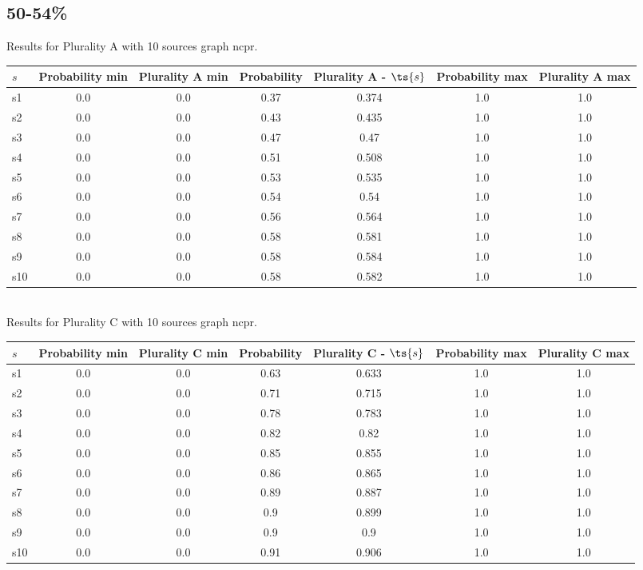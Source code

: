 \documentclass{article}
\begin{document}
\newpage

\subsection{50-54\%}

\noindent Results for Plurality A with 10 sources graph ncpr.

\noindent\begin{tabular}{|l|c|c|c|c|c|c|}
\hline
$s$& Probability min & Plurality A min & Probability & Plurality A - $\ts{s}$ & Probability max & Plurality A max\\
\hline
s1 &0.0 & 0.0 & 0.37 & 0.374 & 1.0 & 1.0\\
\hline
s2 &0.0 & 0.0 & 0.43 & 0.435 & 1.0 & 1.0\\
\hline
s3 &0.0 & 0.0 & 0.47 & 0.47 & 1.0 & 1.0\\
\hline
s4 &0.0 & 0.0 & 0.51 & 0.508 & 1.0 & 1.0\\
\hline
s5 &0.0 & 0.0 & 0.53 & 0.535 & 1.0 & 1.0\\
\hline
s6 &0.0 & 0.0 & 0.54 & 0.54 & 1.0 & 1.0\\
\hline
s7 &0.0 & 0.0 & 0.56 & 0.564 & 1.0 & 1.0\\
\hline
s8 &0.0 & 0.0 & 0.58 & 0.581 & 1.0 & 1.0\\
\hline
s9 &0.0 & 0.0 & 0.58 & 0.584 & 1.0 & 1.0\\
\hline
s10 &0.0 & 0.0 & 0.58 & 0.582 & 1.0 & 1.0\\
\hline
\end{tabular}\\

\noindent Results for Plurality C with 10 sources graph ncpr.

\noindent\begin{tabular}{|l|c|c|c|c|c|c|}
\hline
$s$& Probability min & Plurality C min & Probability & Plurality C - $\ts{s}$ & Probability max & Plurality C max\\
\hline
s1 &0.0 & 0.0 & 0.63 & 0.633 & 1.0 & 1.0\\
\hline
s2 &0.0 & 0.0 & 0.71 & 0.715 & 1.0 & 1.0\\
\hline
s3 &0.0 & 0.0 & 0.78 & 0.783 & 1.0 & 1.0\\
\hline
s4 &0.0 & 0.0 & 0.82 & 0.82 & 1.0 & 1.0\\
\hline
s5 &0.0 & 0.0 & 0.85 & 0.855 & 1.0 & 1.0\\
\hline
s6 &0.0 & 0.0 & 0.86 & 0.865 & 1.0 & 1.0\\
\hline
s7 &0.0 & 0.0 & 0.89 & 0.887 & 1.0 & 1.0\\
\hline
s8 &0.0 & 0.0 & 0.9 & 0.899 & 1.0 & 1.0\\
\hline
s9 &0.0 & 0.0 & 0.9 & 0.9 & 1.0 & 1.0\\
\hline
s10 &0.0 & 0.0 & 0.91 & 0.906 & 1.0 & 1.0\\
\hline
\end{tabular}\\
\end{document}
